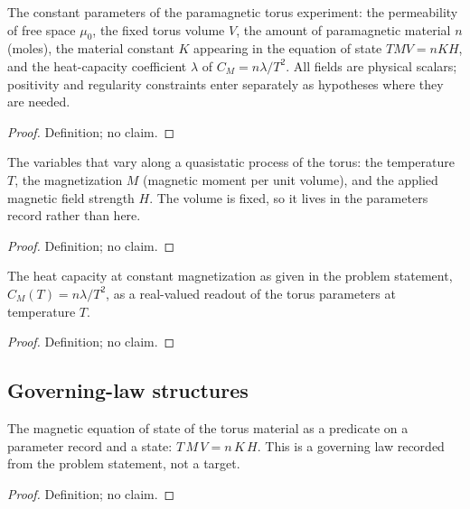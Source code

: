 \begin{definition}
\label{def:IPhO2026Problems_problem_IPhO_2026_3_B_1:TorusParams}
The constant parameters of the paramagnetic torus experiment: the
permeability of free space $\mu_0$, the fixed torus volume $V$, the amount
of paramagnetic material $n$ (moles), the material constant $K$ appearing
in the equation of state $T M V = n K H$, and the heat-capacity coefficient
$\lambda$ of $C_M = n\lambda/T^2$.  All fields are physical scalars;
positivity and regularity constraints enter separately as hypotheses where
they are needed.
\end{definition}
\begin{proof}
Definition; no claim.
\end{proof}

\begin{definition}
\label{def:IPhO2026Problems_problem_IPhO_2026_3_B_1:TorusState}
The variables that vary along a quasistatic process of the torus: the
temperature $T$, the magnetization $M$ (magnetic moment per unit volume),
and the applied magnetic field strength $H$.  The volume is fixed, so it
lives in the parameters record rather than here.
\end{definition}
\begin{proof}
Definition; no claim.
\end{proof}

\begin{definition}
\label{def:IPhO2026Problems_problem_IPhO_2026_3_B_1:HeatCapacityConstM}
The heat capacity at constant magnetization as given in the problem
statement, $C_M(T) = n\lambda/T^2$, as a real-valued readout of the torus
parameters at temperature $T$.
\end{definition}
\begin{proof}
Definition; no claim.
\end{proof}

\subsection*{Governing-law structures}

\begin{definition}
\label{def:IPhO2026Problems_problem_IPhO_2026_3_B_1:SatisfiesEOS}
The magnetic equation of state of the torus material as a predicate on a
parameter record and a state: $T\,M\,V = n\,K\,H$.  This is a governing law
recorded from the problem statement, not a target.
\end{definition}
\begin{proof}
Definition; no claim.
\end{proof}

